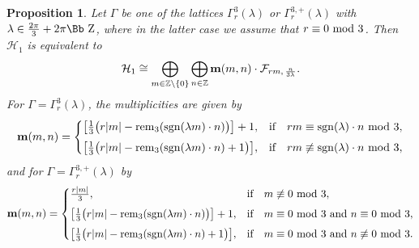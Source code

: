 \documentclass[10pt,a4paper]{amsart}
\newcommand\ZZ{{\mbox{\Bb Z}}}
\newcommand\Z{{\mathbb Z}}
\newcommand\bm{\textbf{{\rm \textbf{m}}}}
\newcommand\cH{{\mathcal H}}
\newcommand\cF{{\mathcal F}}
\newcommand{\sgn}{\mathop{{\rm sgn}}}
\newcommand{\rem}{\mathop{{\rm rem}}}
\numberwithin{equation}{section}
\newtheorem{Proposition}[Theorem]{Proposition}
 { \theoremstyle{definition}
\newtheorem{Definition}[Theorem]{Definition}
\newtheorem{Note}[Theorem]{Note}
\newtheorem{Example}[Theorem]{Example}
\newtheorem{Remark}[Theorem]{Remark} }
\begin{document}
\begin{Proposition} \label{Pord3} Let $\Gamma$ be one of the lattices $\Gamma_r^3(\lambda)$ or $\Gamma_r^{3,+}(\lambda)$ with $\lambda\in\frac{2\pi}3+2\pi\ZZ$, where in the latter case we assume that $r\equiv 0\ {\rm mod}\ 3$. Then $\cH_1$ is equivalent to
\begin{gather*}
\cH_1\cong\bigoplus_{m\in \Z\backslash\{0\}} \bigoplus_{n\in\Z} \bm(m,n)\cdot \cF_{rm,\,\frac n{3\lambda}}.
\end{gather*}
For $\Gamma=\Gamma_r^3(\lambda)$, the multiplicities are given by
\begin{gather*}
\bm(m,n) =\begin{cases}
\big[\frac13 \big({r|m|-\rem_3(\sgn(\lambda m)\cdot n)\big)}\big]+1,
& \text{if\quad $rm \equiv \sgn(\lambda)\cdot n$ {\rm mod}}\ 3,
\\[1ex]
\big[\frac13\big(r|m|-\rem_3(\sgn(\lambda m)\cdot n)+1\big)\big],
& \text{if\quad $rm\not\equiv \sgn(\lambda)\cdot n$ {\rm mod} $3$},
\end{cases}
\end{gather*}
and for $\Gamma=\Gamma_r^{3,+}(\lambda)$ by
\begin{gather*}
\bm(m,n) =
\begin{cases}
\frac{r|m|}{3},&\text{if\quad $m\not\equiv 0$ {\rm mod} $3$},
\\[1ex]
\big[\frac13\big(r|m|-\rem_3(\sgn(\lambda m)\cdot n)\big)\big]+1,
& \text{if\quad $m \equiv 0$ {\rm mod 3} and $n\equiv 0$ \rm{mod 3}},
\\[1ex]
\big[\frac13\big(r|m|-\rem_3(\sgn(\lambda m)\cdot n)+1\big)\big],
&\text{if\quad $m \equiv 0$ {\rm mod 3} and $n\not \equiv 0$ \rm{mod 3}}.
\end{cases}
\end{gather*}
\end{Proposition}
\end{document}
